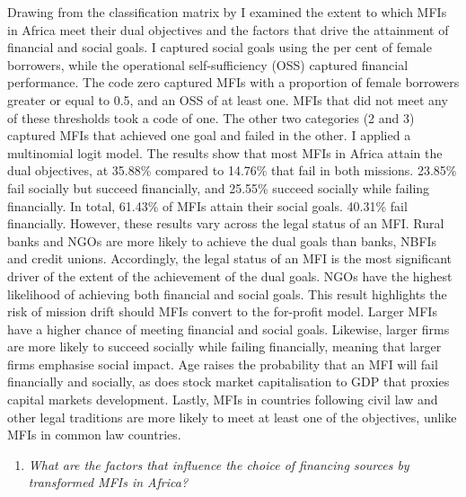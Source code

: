 \documentclass[a4paper, nobind]{templates/ociamthesis}
\providecommand{\tightlist}{%
  \setlength{\itemsep}{0pt}\setlength{\parskip}{0pt}}
\begin{document}
Drawing from the classification matrix by \textcite{chattopadhyay2017applicability} I examined the extent to which MFIs in Africa meet their dual objectives and the factors that drive the attainment of financial and social goals. I captured social goals using the per cent of female borrowers, while the operational self-sufficiency (OSS) captured financial performance. The code zero captured MFIs with a proportion of female borrowers greater or equal to 0.5, and an OSS of at least one. MFIs that did not meet any of these thresholds took a code of one. The other two categories (2 and 3) captured MFIs that achieved one goal and failed in the other. I applied a multinomial logit model. The results show that most MFIs in Africa attain the dual objectives, at 35.88\% compared to 14.76\% that fail in both missions. 23.85\% fail socially but succeed financially, and 25.55\% succeed socially while failing financially. In total, 61.43\% of MFIs attain their social goals. 40.31\% fail financially. However, these results vary across the legal status of an MFI. Rural banks and NGOs are more likely to achieve the dual goals than banks, NBFIs and credit unions. Accordingly, the legal status of an MFI is the most significant driver of the extent of the achievement of the dual goals. NGOs have the highest likelihood of achieving both financial and social goals. This result highlights the risk of mission drift should MFIs convert to the for-profit model. Larger MFIs have a higher chance of meeting financial and social goals. Likewise, larger firms are more likely to succeed socially while failing financially, meaning that larger firms emphasise social impact. Age raises the probability that an MFI will fail financially and socially, as does stock market capitalisation to GDP that proxies capital markets development. Lastly, MFIs in countries following civil law and other legal traditions are more likely to meet at least one of the objectives, unlike MFIs in common law countries.

\begin{enumerate}
\def\labelenumi{\arabic{enumi}.}
\setcounter{enumi}{4}
\tightlist
\item
  \emph{What are the factors that influence the choice of financing sources by transformed MFIs in Africa?}
\end{enumerate}
\end{document}
